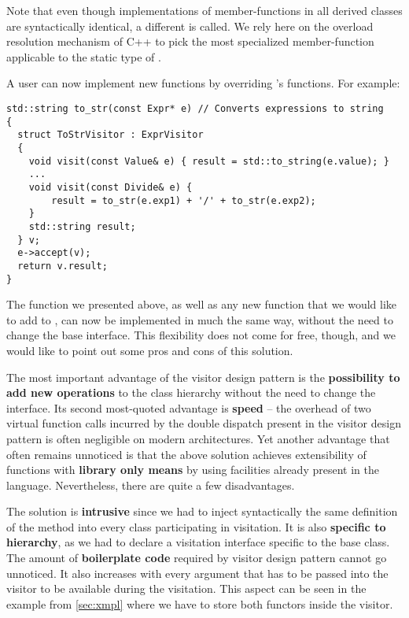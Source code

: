 \noindent
Note that even though implementations of  member-functions in all 
derived classes are syntactically identical, a different  is called. 
We rely here on the overload resolution mechanism of C++ to pick the most 
specialized  member-function applicable to the static type of 
.


A user can now implement new functions by overriding 's 
functions. For example:

\begin{lstlisting}
std::string to_str(const Expr* e) // Converts expressions to string
{
  struct ToStrVisitor : ExprVisitor
  {
    void visit(const Value& e) { result = std::to_string(e.value); }
    ...
    void visit(const Divide& e) { 
        result = to_str(e.exp1) + '/' + to_str(e.exp2); 
    }
    std::string result;
  } v;
  e->accept(v);
  return v.result;
}
\end{lstlisting}

\noindent
The function  we presented above, as well as any new function that we 
would like to add to , can now be implemented in much the same way, 
without the need to change the base interface. This flexibility does not come for free, 
though, and we would like to point out some pros and cons of this solution.

The most important advantage of the visitor design pattern is the {\bf possibility 
to add new operations} to the class hierarchy without the need to change 
the interface. Its second most-quoted advantage is {\bf speed} -- the 
overhead of two virtual function calls incurred by the double  
dispatch present in the visitor design pattern is often negligible on modern 
architectures. Yet another advantage that often remains unnoticed is that the 
above solution achieves extensibility of functions with {\bf library only means} 
by using facilities already present in the language. Nevertheless, there are 
quite a few disadvantages.

The solution is {\bf intrusive} since we had to inject syntactically the same 
definition of the  method into every class participating in visitation. 
It is also {\bf specific to hierarchy}, as we had to declare a visitation 
interface specific to the base class. The amount of {\bf boilerplate code} 
required by visitor design pattern cannot go unnoticed. It also increases with 
every argument that has to be passed into the visitor to be available during the 
visitation. This aspect can be seen in the example from \textsection\ref{sec:xmpl} 
where we have to store both functors inside the visitor.

